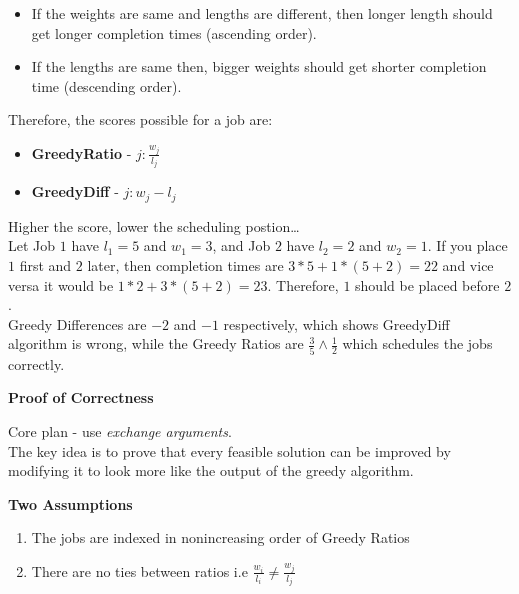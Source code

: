 \documentclass{article}
\begin{document}
	\begin{itemize}
		\item If the weights are same and lengths are different, then longer length should get longer completion times (ascending order).
		\item If the lengths are same then, bigger weights should get shorter completion time (descending order).
	\end{itemize}
	
	Therefore, the scores possible for a job are: 
	\begin{itemize}
		\item \textbf{GreedyRatio} -  $j: \frac{w_j}{l_j}$ 
		\item \textbf{GreedyDiff} - $j: w_j - l_j$
	\end{itemize}
	Higher the score, lower the scheduling postion\ldots \\
	
	Let Job $1$ have $l_1 = 5$ and $w_1 = 3$, and Job $2$ have $l_2 = 2$ and $w_2 = 1$. If you place $1$ first and $2$ later, then completion times are $3*5 + 1*(5+2) = 22$ and vice versa it would be $1*2 + 3*(5+2) = 23$. Therefore, $1$ should be placed before $2$. \\
	
	Greedy Differences are $-2$ and $-1$ respectively, which shows GreedyDiff algorithm is wrong, while the Greedy Ratios are $\frac{3}{5} \land \frac{1}{2}$ which schedules the jobs correctly.
	
	\begin{center}
		\begin{large}
			\textbf{Proof of Correctness} \\
		\end{large}
	\end{center}
	
	 Core plan - use \textit{exchange arguments}.  \\
	
	The key idea is to prove that every feasible solution can be improved by modifying it to look more like the output of the greedy algorithm.
	
	\begin{center}
		\begin{small}
			\textbf{Two Assumptions} \\
		\end{small}
	\end{center}
	
	\begin{enumerate}
		\item The jobs are indexed in nonincreasing order of Greedy Ratios
		\item There are no ties between ratios i.e $\frac{w_i}{l_i} \neq \frac{w_j}{l_j}$
	\end{enumerate}
	
\end{document}
